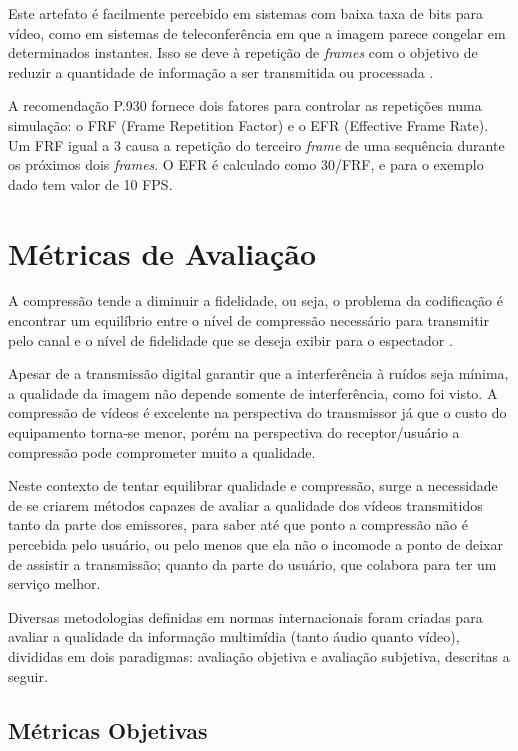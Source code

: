 Este artefato é facilmente percebido em sistemas com baixa taxa de bits para vídeo, como em sistemas de teleconferência \cite{itup930} em que a imagem parece congelar em determinados instantes. Isso se deve à repetição de \emph{frames} com o objetivo de reduzir a quantidade de informação a ser transmitida ou processada \cite{itup930}.

A recomendação P.930 fornece dois fatores para controlar as repetições numa simulação: o FRF (Frame Repetition Factor) e o EFR (Effective Frame Rate). Um FRF igual a 3 causa a repetição do terceiro \emph{frame} de uma sequência durante os próximos dois \emph{frames}. O EFR é calculado como 30/FRF, e para o exemplo dado tem valor de 10 FPS.

\section{Métricas de Avaliação}

A compressão tende a diminuir a fidelidade, ou seja, o problema da codificação é encontrar um equilíbrio entre o nível de compressão necessário para transmitir pelo canal e o nível de fidelidade que se deseja exibir para o espectador \cite{daronco}.

Apesar de a transmissão digital garantir que a interferência à ruídos seja mínima, a qualidade da imagem não depende somente de interferência, como foi visto. A compressão de vídeos é excelente na perspectiva do transmissor já que o custo do equipamento torna-se menor, porém na perspectiva do receptor/usuário a compressão pode comprometer muito a qualidade.

Neste contexto de tentar equilibrar qualidade e compressão, surge a necessidade de se criarem métodos capazes de avaliar a qualidade dos vídeos transmitidos tanto da parte dos emissores, para saber até que ponto a compressão não é percebida pelo usuário, ou pelo menos que ela não o incomode a ponto de deixar de assistir a transmissão; quanto da parte do usuário, que colabora para ter um serviço melhor.

Diversas metodologias definidas em normas internacionais foram criadas para avaliar a qualidade da informação multimídia (tanto áudio quanto vídeo), divididas em dois paradigmas: avaliação objetiva e avaliação subjetiva, descritas a seguir.

\subsection{Métricas Objetivas}

